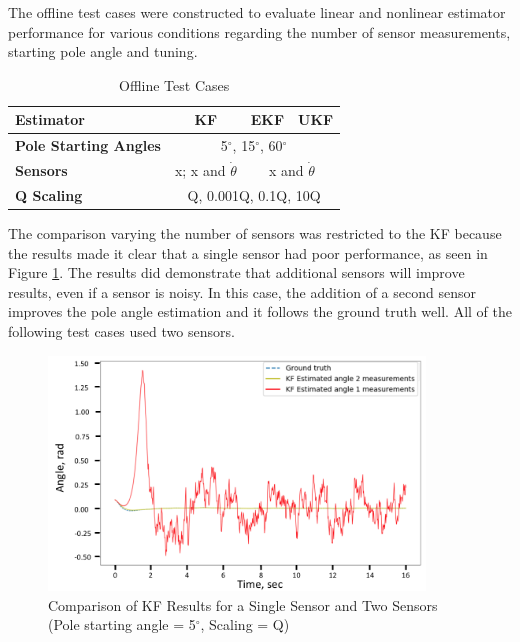 \documentclass{article}
\begin{document}
The offline test cases were constructed to evaluate linear and nonlinear estimator performance for various conditions regarding the number of sensor measurements, starting pole angle and tuning.
\begin{table}[h!]
 \centering
 \renewcommand{\arraystretch}{1.5}
 \begin{tabular}{ |l |c  |c |c |}
 \hline
 	 \textbf{Estimator} & \textbf{KF} & \textbf{EKF} & \textbf{UKF} \\ \hline
 	 \textbf{Pole Starting Angles}  & \multicolumn{3}{|c|}{5$^{\circ}$, 15$^{\circ}$, 60$^{\circ}$} \\ \hline
 	 \textbf{Sensors} & x; x and $\dot\theta$ & \multicolumn{2}{|c|}{x and $\dot\theta$} \\ \hline
 	 \textbf{Q Scaling}  & \multicolumn{3}{|c|}{Q, 0.001Q, 0.1Q, 10Q} \\ \hline
 \end{tabular}
 \caption{Offline Test Cases}
 \label{table:offlinecases}
 \end{table}
The comparison varying the number of sensors was restricted to the KF because the results made it clear that a single sensor had poor performance, as seen in Figure \ref{fig:sensorsKF}.  The results did demonstrate that additional sensors will improve results, even if a sensor is noisy.  In this case, the addition of a second sensor improves the pole angle estimation and it follows the ground truth well.  All of the following test cases used two sensors.
\begin{figure}[h!]
 	\centering
 	\includegraphics[width=10cm,keepaspectratio]{SensorsKF.png}
 	\caption{Comparison of KF Results for a Single Sensor and Two Sensors (Pole starting angle = 5$^{\circ}$, Scaling = Q)}
 	\label{fig:sensorsKF}
 \end{figure}
 
\end{document}
